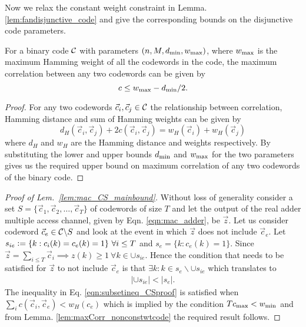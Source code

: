 Now we relax the constant weight constraint in Lemma. \ref{lem:fandisjunctive_code} and give the corresponding bounds on the disjunctive code parameters.

\begin{lemma}
\label{lem:maxCorr_nonconstwtcode}
For a binary code $\mathcal{C}$ with parameters $(n,M,d_{\mathrm{min}},w_{\text{max}})$, where $w_{\text{max}}$ is the maximum Hamming weight of all the codewords in the code, the maximum correlation between any two codewords can be given by
\[
c\leq w_{\text{max}}-d_{\mathrm{min}}/2.
\]
\end{lemma}
\begin{proof}
For any two codewords $\vec{c}_i, \vec{c}_j\in\mathcal{C}$ the relationship between correlation, Hamming distance and sum of Hamming weights can be given by
\[
d_H(\vec{c}_i,\vec{c}_j)+2c(\vec{c}_i,\vec{c}_j)=w_H(\vec{c}_i)+w_H(\vec{c}_j)
\]
where $d_H$ and $w_H$ are the Hamming distance and weights respectively. By substituting the lower and upper bounds $d_{\mathrm{min}}$ and $w_{\text{max}}$ for the two parameters gives us the required upper bound on maximum correlation of any two codewords of the binary code.
\end{proof}
\begin{proof}[Proof of Lem.~\ref{lem:mac_CS_mainbound}]
Without loss of generality consider a set $S=\{\vec{c}_1,\vec{c}_2,\ldots, \vec{c}_T\}$ of codewords of size $T$ and let the output of the real adder multiple access channel, given by Eqn. \eqref{eqn:mac_adder}, be $\vec{z}$. Let us consider codeword $\vec{c}_e\in\mathcal{C}\backslash S$ and look at the event in which $\vec{z}$ does not include $\vec{c}_e$. Let $s_{ie}\mathrel{\mathop:}=\{k:c_{i}(k)=c_{e}(k)=1\}~\forall i\leq T$ and  $s_{e}=\{k: c_{e}(k)=1\}$. Since $\vec{z}=\sum_{i\leq T}\vec{c}_i\implies z(k)\geq 1 ~\forall k\in \cup s_{ie}$. Hence the condition that needs to be satisfied for $\vec{z}$ to not include $\vec{c}_e$ is that $\exists k: k\in s_e\backslash \cup s_{ie}$ which translates to
\begin{align}
 |\cup s_{ie}|< |s_e|.\label{eqn:subsetineq_CSproof}
\end{align}
The inequality in Eq. \eqref{eqn:subsetineq_CSproof} is satisfied when $\sum_i c(\vec{c}_i,\vec{c}_e)<w_H(c_e)$ which is implied by the condition $Tc_{\max}<w_{\text{min}}$ and from Lemma. \ref{lem:maxCorr_nonconstwtcode} the required result follows.
\end{proof}

